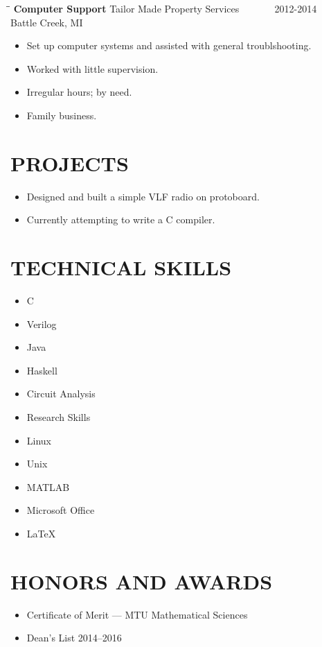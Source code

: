 \documentclass[letterpaper]{res}
\begin{document}
\begin{resume}
  \vspace{-0.15in}
  \begin{tabbing}
    \hspace{2.3in}\= \hspace{2.6in}\= \kill %
    {\bf Computer Support} \>Tailor Made Property Services \> ~~~~~~ 2012-2014\\
    \>Battle Creek, MI
  \end{tabbing}\vspace{-10pt}
  \begin{itemize} \itemsep1pt \parskip0pt 
    \item Set up computer systems and assisted with general troublshooting.
    \item Worked with little supervision.
    \item Irregular hours; by need.
    \item Family business.
  \end{itemize}

  \section{PROJECTS}
  \begin{itemize}
    \item Designed and built a simple VLF radio on protoboard.
    \item Currently attempting to write a C compiler.
  \end{itemize}

  \section{TECHNICAL SKILLS}
  \vspace{-1pt}
  \begin{multicols}{4}
    \begin{itemize} \itemsep1pt \parskip0pt 
      \item C
      \item Verilog
      \item Java
      \item Haskell
      \item Circuit Analysis
      \item Research Skills
      \item Linux
      \item Unix
      \item MATLAB
      \item Microsoft Office
      \item LaTeX
    \end{itemize}
  \end{multicols}

  \section{HONORS AND AWARDS}
  \begin{itemize}
    \item Certificate of Merit --- MTU Mathematical Sciences
    \item Dean's List 2014--2016
  \end{itemize}

\end{resume}
\end{document}
